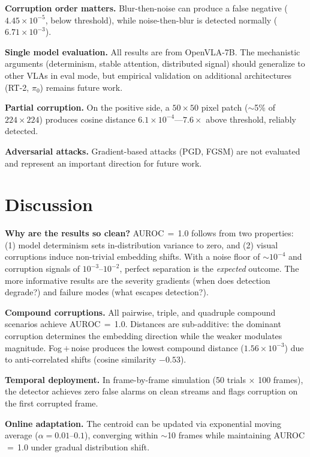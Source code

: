 \documentclass[11pt]{article}
\begin{document}
\textbf{Corruption order matters.}
Blur-then-noise can produce a false negative ($4.45 \times 10^{-5}$, below threshold), while noise-then-blur is detected normally ($6.71 \times 10^{-3}$).

\textbf{Single model evaluation.}
All results are from OpenVLA-7B.
The mechanistic arguments (determinism, stable attention, distributed signal) should generalize to other VLAs in eval mode, but empirical validation on additional architectures (RT-2, $\pi_0$) remains future work.

\textbf{Partial corruption.}
On the positive side, a $50\times50$ pixel patch ($\sim$5\% of $224\times224$) produces cosine distance $6.1 \times 10^{-4}$---$7.6\times$ above threshold, reliably detected.

\textbf{Adversarial attacks.}
Gradient-based attacks (PGD, FGSM) are not evaluated and represent an important direction for future work.

\section{Discussion}
\label{sec:discussion}

\textbf{Why are the results so clean?}
AUROC\,$=$\,1.0 follows from two properties: (1) model determinism sets in-distribution variance to zero, and (2) visual corruptions induce non-trivial embedding shifts.
With a noise floor of $\sim$$10^{-4}$ and corruption signals of $10^{-3}\text{--}10^{-2}$, perfect separation is the \emph{expected} outcome.
The more informative results are the severity gradients (when does detection degrade?) and failure modes (what escapes detection?).

\textbf{Compound corruptions.}
All pairwise, triple, and quadruple compound scenarios achieve AUROC\,$=$\,1.0.
Distances are sub-additive: the dominant corruption determines the embedding direction while the weaker modulates magnitude.
Fog\,$+$\,noise produces the lowest compound distance ($1.56 \times 10^{-3}$) due to anti-correlated shifts (cosine similarity $-0.53$).

\textbf{Temporal deployment.}
In frame-by-frame simulation (50 trials $\times$ 100 frames), the detector achieves zero false alarms on clean streams and flags corruption on the first corrupted frame.

\textbf{Online adaptation.}
The centroid can be updated via exponential moving average ($\alpha = 0.01\text{--}0.1$), converging within $\sim$10 frames while maintaining AUROC\,$=$\,1.0 under gradual distribution shift.
\end{document}
